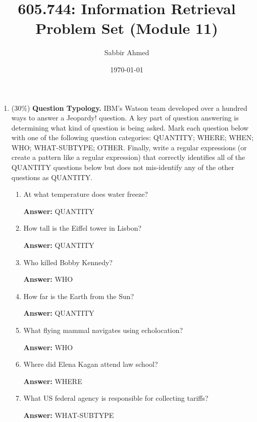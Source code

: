 \documentclass[11pt]{article}
\title{605.744: Information Retrieval \\ Problem Set (Module 11)}
\author{Sabbir Ahmed}
\date{\today}
\begin{document}
\maketitle

\begin{enumerate}

      \item (30\%) \textbf{Question Typology.} IBM's Watson team developed over a hundred ways to answer a Jeopardy! question. A key part of question answering is determining what kind of question is being asked. Mark each question below with one of the following question categories: QUANTITY; WHERE; WHEN; WHO; WHAT-SUBTYPE; OTHER. Finally, write a regular expressions (or create a pattern like a regular expression) that correctly identifies all of the QUANTITY questions below but does not mis-identify any of the other questions as QUANTITY.

            \begin{enumerate}
                  \item At what temperature does water freeze?

                        \textbf{Answer:} QUANTITY

                  \item How tall is the Eiffel tower in Lisbon?

                        \textbf{Answer:} QUANTITY

                  \item Who killed Bobby Kennedy?

                        \textbf{Answer:} WHO

                  \item How far is the Earth from the Sun?

                        \textbf{Answer:} QUANTITY

                  \item What flying mammal navigates using echolocation?

                        \textbf{Answer:} WHO

                  \item Where did Elena Kagan attend law school?

                        \textbf{Answer:} WHERE

                  \item What US federal agency is responsible for collecting tariffs?

                        \textbf{Answer:} WHAT-SUBTYPE


\end{enumerate}
\end{enumerate}
\end{document}
